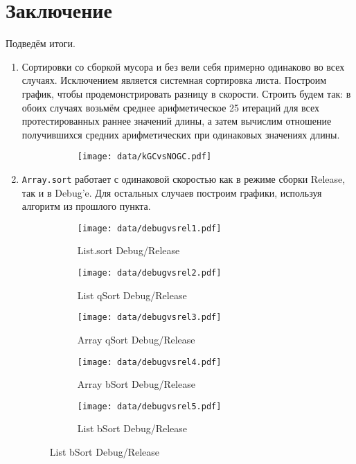 \section{Заключение}

Подведём итоги.
\begin{enumerate}
  \item Сортировки со сборкой мусора и без вели себя примерно одинаково во всех случаях. Исключением является системная сортировка листа. Построим график, чтобы продемонстрировать разницу в скорости. Строить будем так: в обоих случаях возьмём среднее арифметическое 25 итераций для всех протестированных раннее значений длины, а затем вычислим отношение получившихся средних арифметических при одинаковых значениях длины.
  	\begin{figure}[H]
	\centering
	\begin{subfigure}[b]{0.40\textwidth}
       \centering
	   \texttt{[image: data/kGCvsNOGC.pdf]}
	\end{subfigure}
	\end{figure}
  \item \verb|Array.sort| работает с одинаковой скоростью как в режиме сборки Release, так и в Debug'e. Для остальных случаев построим графики, используя алгоритм из прошлого пункта.
  	\begin{figure}[H]
	\centering
	\begin{subfigure}[b]{0.40\textwidth}
       \centering
	   \texttt{[image: data/debugvsrel1.pdf]}
	   \caption{List.sort Debug/Release}
	\end{subfigure}
	\begin{subfigure}[b]{0.40\textwidth}
       \centering
	   \texttt{[image: data/debugvsrel2.pdf]}
	   \caption{List qSort Debug/Release}
	\end{subfigure}
	\begin{subfigure}[b]{0.40\textwidth}
       \centering
	   \texttt{[image: data/debugvsrel3.pdf]}
	   \caption{Array qSort Debug/Release}
	\end{subfigure}
	\begin{subfigure}[b]{0.40\textwidth}
       \centering
	   \texttt{[image: data/debugvsrel4.pdf]}
	   \caption{Array bSort Debug/Release}
	\end{subfigure}
	\begin{subfigure}[b]{0.40\textwidth}
       \centering
	   \texttt{[image: data/debugvsrel5.pdf]}
	   \caption{List bSort Debug/Release}

\end{subfigure}
\end{figure}
\end{enumerate}
